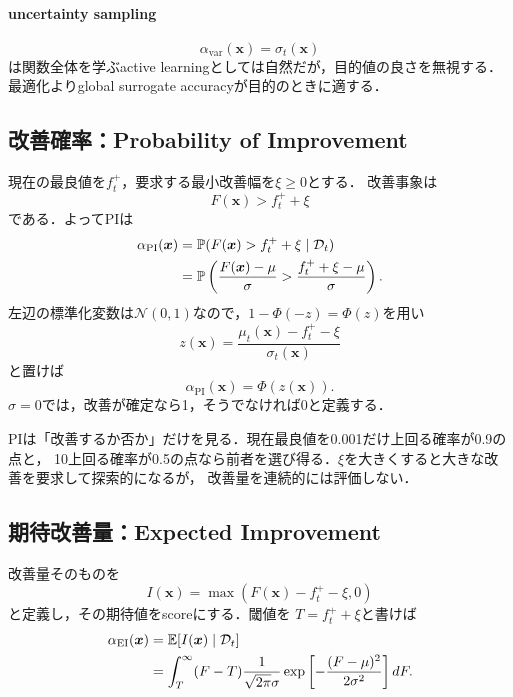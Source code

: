 \documentclass[a4paper,11pt]{ltjsarticle}
\newcommand{\E}{\mathbb E}
\newcommand{\Pp}{\mathbb P}
\newcommand{\N}{\mathcal N}
\newcommand{\D}{\mathcal D}
\begin{document}
\paragraph{uncertainty sampling}
\begin{equation}
  \alpha_{\mathrm{var}}(\bm x)=\sigma_t(\bm x)
  \label{eq:uncertainty-sampling}
\end{equation}
は関数全体を学ぶactive learningとしては自然だが，目的値の良さを無視する．
最適化よりglobal surrogate accuracyが目的のときに適する．

\subsection{改善確率：Probability of Improvement}
\label{sec:pi}

現在の最良値を\(f_t^+\)，要求する最小改善幅を\(\xi\geq0\)とする．
改善事象は
\begin{equation}
  F(\bm x)>f_t^++\xi
\end{equation}
である．よってPIは
\begin{align}
  \alpha_{\mathrm{PI}}(\bm x)
  &=\Pp(F(\bm x)>f_t^++\xi\mid\D_t)\notag\\
  &=\Pp\left(
  \frac{F(\bm x)-\mu}{\sigma}
  >\frac{f_t^++\xi-\mu}{\sigma}
  \right).
\end{align}
左辺の標準化変数は\(\N(0,1)\)なので，\(1-\Phi(-z)=\Phi(z)\)を用い
\begin{equation}
  z(\bm x)=\frac{\mu_t(\bm x)-f_t^+-\xi}{\sigma_t(\bm x)}
  \label{eq:pi-z}
\end{equation}
と置けば
\begin{equation}
  \boxed{
  \alpha_{\mathrm{PI}}(\bm x)=\Phi(z(\bm x)).}
  \label{eq:pi-acquisition}
\end{equation}
\(\sigma=0\)では，改善が確定なら1，そうでなければ0と定義する．

\begin{intuitionbox}[PIの長所と弱点]
PIは「改善するか否か」だけを見る．現在最良値を0.001だけ上回る確率が0.9の点と，
10上回る確率が0.5の点なら前者を選び得る．\(\xi\)を大きくすると大きな改善を要求して探索的になるが，
改善量を連続的には評価しない．
\end{intuitionbox}

\subsection{期待改善量：Expected Improvement}
\label{sec:ei}

改善量そのものを
\begin{equation}
  I(\bm x)=\max(F(\bm x)-f_t^+-\xi,0)
  \label{eq:improvement-rv}
\end{equation}
と定義し，その期待値をscoreにする\citep{jones1998ego}．閾値を
\(T=f_t^++\xi\)と書けば
\begin{align}
  \alpha_{\mathrm{EI}}(\bm x)
  &=\E[I(\bm x)\mid\D_t]\notag\\
  &=\int_T^\infty(F-T)
  \frac{1}{\sqrt{2\pi}\sigma}
  \exp\left[-\frac{(F-\mu)^2}{2\sigma^2}\right]dF.
  \label{eq:ei-integral}
\end{align}
\end{document}

